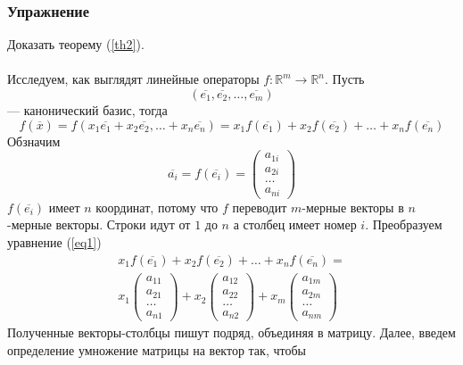 \documentclass[]{article}
\begin{document}
	\subsubsection{Упражнение}
	Доказать теорему (\ref{th2}).
	\\
	\\
	Исследуем, как выглядят линейные операторы $f:\mathbb{R}^m\rightarrow\mathbb{R}^n$. Пусть $$(\overline{e_1}, \overline{e_2}, \ldots, \overline{e_m})$$ --- канонический базис, тогда 
		\begin{equation}\label{eq1}
			f(\overline{x})=
	f(x_1\overline{e_1}+ x_2\overline{e_2},\ldots+ x_n\overline{e_n})
	=
	x_1f(\overline{e_1})+ x_2f(\overline{e_2})+\ldots+ x_nf(\overline{e_n})
\end{equation}
	 Обзначим
	 \begin{equation}
	 	\overline{a_i}=
	 	f(\overline{e_i})=
	 	\begin{pmatrix}
	 		a_{1i}
	 		\\
	 		a_{2i}
	 		\\
	 		\ldots
	 		\\
			a_{ni}
	 	\end{pmatrix}
	 \end{equation}
	 $f(\overline{e_i})$ имеет $n$ координат, потому что $f$ переводит $m$-мерные векторы в $n$-мерные векторы. Строки идут от $1$ до $n$ а столбец имеет номер $i$. Преобразуем уравнение (\ref{eq1})
	 \begin{gather*}
	 	x_1f(\overline{e_1})+ x_2f(\overline{e_2})+\ldots+ x_nf(\overline{e_n})
	 	=
	 	\\
	 	x_1
	 	\begin{pmatrix}
	 		a_{11}
	 		\\
	 		a_{21}
	 		\\
	 		\ldots
	 		\\
	 		a_{n1}
	 	\end{pmatrix}
	 	+
	 	x_2
	 	\begin{pmatrix}
	 		a_{12}
	 		\\
	 		a_{22}
	 		\\
	 		\ldots
	 		\\
	 		a_{n2}
	 	\end{pmatrix}
	 	+
x_m
\begin{pmatrix}
	a_{1m}
	\\
	a_{2m}
	\\
	\ldots
	\\
	a_{nm}
\end{pmatrix}
	 \end{gather*}
	 Полученные векторы-столбцы пишут подряд, объединяя в матрицу. Далее, введем определение умножение матрицы на вектор так, чтобы 
\end{document}

